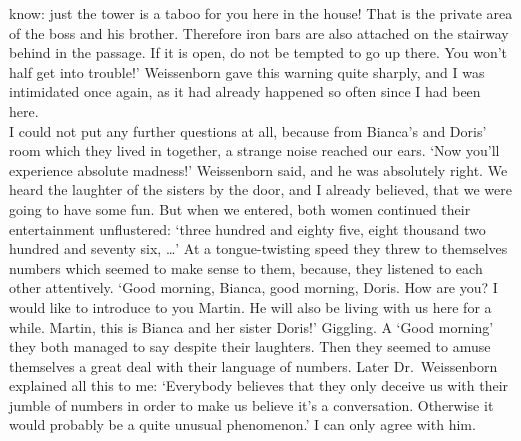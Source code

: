 know: just the tower is a taboo for you here in the house! 
That is the private area of the boss and his brother. 
Therefore iron bars are also attached on the stairway behind in the passage. 
If it is open, do not be tempted to go up there. 
You won't half get into trouble!'
Weissenborn gave this warning quite sharply, and I was intimidated once again, as it 
had already happened so often since I had been here. \\ 
I could not put any further questions at all, because from Bianca's and Doris' room 
which they lived in together, a strange noise reached our ears. 
`Now you'll experience absolute madness!' Weissenborn said, and he was absolutely right. 
We heard the laughter of the sisters by the door, and I already believed, that we 
were going to have some fun.
But when we entered, both women continued their entertainment unflustered: `three 
hundred and eighty five, eight thousand two hundred and seventy six, \dots' 
At a tongue-twisting speed they threw to themselves numbers which seemed to make 
sense to them, because, they listened to each other attentively. 
`Good morning, Bianca, good morning, Doris. How are you? 
I would like to introduce to you Martin. He will also be living with us here for a while. 
Martin, this is Bianca and her sister Doris!'
Giggling. 
A `Good morning' they both managed to say despite their laughters. 
Then they seemed to amuse themselves a great deal with their language of numbers.
Later Dr.~Weissenborn explained all this to me: 
`Everybody believes that they only deceive us with their jumble of numbers in order 
to make us believe it's a conversation. 
Otherwise it would probably be a quite unusual phenomenon.'
I can only agree with him. 


